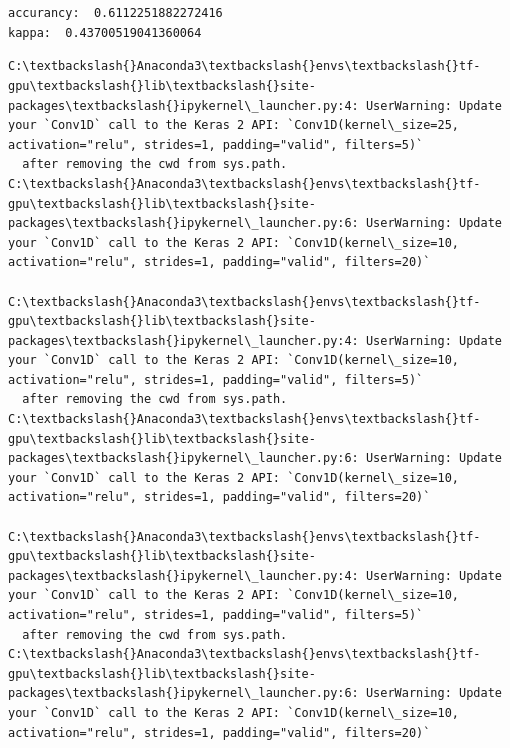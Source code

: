 \documentclass[11pt]{article}
\begin{document}
    \begin{center}
    \end{center}
    { \hspace*{\fill} \\}
    
    \begin{center}
    \end{center}
    { \hspace*{\fill} \\}
    
    \begin{Verbatim}[commandchars=\\\{\}]
accurancy:  0.6112251882272416
kappa:  0.43700519041360064

    \end{Verbatim}

    \begin{Verbatim}[commandchars=\\\{\}]
C:\textbackslash{}Anaconda3\textbackslash{}envs\textbackslash{}tf-gpu\textbackslash{}lib\textbackslash{}site-packages\textbackslash{}ipykernel\_launcher.py:4: UserWarning: Update your `Conv1D` call to the Keras 2 API: `Conv1D(kernel\_size=25, activation="relu", strides=1, padding="valid", filters=5)`
  after removing the cwd from sys.path.
C:\textbackslash{}Anaconda3\textbackslash{}envs\textbackslash{}tf-gpu\textbackslash{}lib\textbackslash{}site-packages\textbackslash{}ipykernel\_launcher.py:6: UserWarning: Update your `Conv1D` call to the Keras 2 API: `Conv1D(kernel\_size=10, activation="relu", strides=1, padding="valid", filters=20)`
  
C:\textbackslash{}Anaconda3\textbackslash{}envs\textbackslash{}tf-gpu\textbackslash{}lib\textbackslash{}site-packages\textbackslash{}ipykernel\_launcher.py:4: UserWarning: Update your `Conv1D` call to the Keras 2 API: `Conv1D(kernel\_size=10, activation="relu", strides=1, padding="valid", filters=5)`
  after removing the cwd from sys.path.
C:\textbackslash{}Anaconda3\textbackslash{}envs\textbackslash{}tf-gpu\textbackslash{}lib\textbackslash{}site-packages\textbackslash{}ipykernel\_launcher.py:6: UserWarning: Update your `Conv1D` call to the Keras 2 API: `Conv1D(kernel\_size=10, activation="relu", strides=1, padding="valid", filters=20)`
  
C:\textbackslash{}Anaconda3\textbackslash{}envs\textbackslash{}tf-gpu\textbackslash{}lib\textbackslash{}site-packages\textbackslash{}ipykernel\_launcher.py:4: UserWarning: Update your `Conv1D` call to the Keras 2 API: `Conv1D(kernel\_size=10, activation="relu", strides=1, padding="valid", filters=5)`
  after removing the cwd from sys.path.
C:\textbackslash{}Anaconda3\textbackslash{}envs\textbackslash{}tf-gpu\textbackslash{}lib\textbackslash{}site-packages\textbackslash{}ipykernel\_launcher.py:6: UserWarning: Update your `Conv1D` call to the Keras 2 API: `Conv1D(kernel\_size=10, activation="relu", strides=1, padding="valid", filters=20)`
  

    \end{Verbatim}
\end{document}
